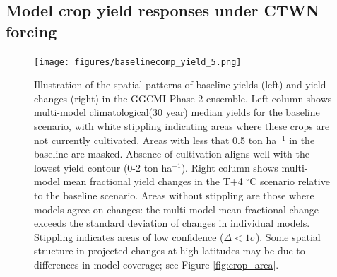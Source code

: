 \documentclass[gmd, manuscript]{copernicus} %
\begin{document}
\subsection{Model crop yield responses under CTWN forcing}
\begin{figure}[ht]
\centering
  \texttt{[image: figures/baselinecomp\_yield\_5.png]} 
  \caption{
  Illustration of the spatial patterns of baseline yields (left) and yield changes (right) in the GGCMI Phase 2 ensemble. 
  Left column shows multi-model climatological(30 year) median yields for the baseline scenario, with white stippling indicating areas where these crops are not currently cultivated. 
  Areas with less that 0.5 ton ha$^{-1}$ in the baseline are masked.
  Absence of cultivation aligns well with the lowest yield contour (0-2 ton ha$^{-1}$). 
  Right column shows multi-model mean fractional yield changes in the T+4 $^{\circ}$C scenario relative to the baseline scenario. 
  Areas without stippling are those where models agree on changes: the multi-model mean fractional change exceeds the standard deviation of changes in individual models. 
  Stippling indicates areas of low confidence ($\Delta < 1 \sigma$). 
  Some spatial structure in projected changes at high latitudes may be due to differences in model coverage; see Figure \ref{fig:crop_area}.
  }
  \label{fig:maizesoybaseline}
\end{figure}
\end{document}
